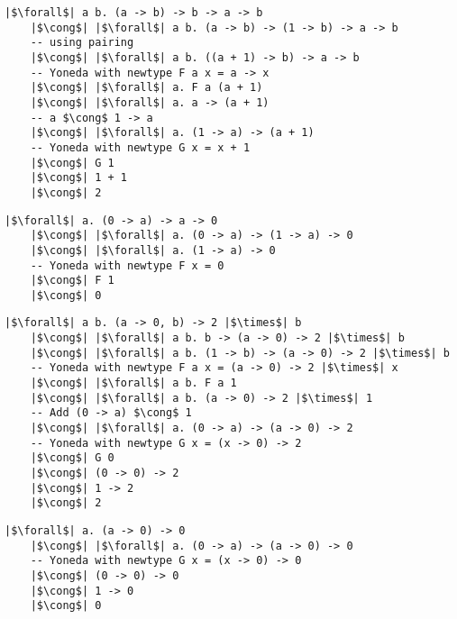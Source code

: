 \documentclass[tikz]{beamer}
\theoremstyle{definition}
\begin{document}
\begin{frame}[fragile]
\begin{verbatim}
|$\forall$| a b. (a -> b) -> b -> a -> b
    |$\cong$| |$\forall$| a b. (a -> b) -> (1 -> b) -> a -> b
    -- using pairing
    |$\cong$| |$\forall$| a b. ((a + 1) -> b) -> a -> b
    -- Yoneda with newtype F a x = a -> x
    |$\cong$| |$\forall$| a. F a (a + 1)
    |$\cong$| |$\forall$| a. a -> (a + 1)
    -- a $\cong$ 1 -> a
    |$\cong$| |$\forall$| a. (1 -> a) -> (a + 1)
    -- Yoneda with newtype G x = x + 1
    |$\cong$| G 1
    |$\cong$| 1 + 1
    |$\cong$| 2
\end{verbatim}
\end{frame}

\begin{frame}[fragile]
\begin{verbatim}
|$\forall$| a. (0 -> a) -> a -> 0
    |$\cong$| |$\forall$| a. (0 -> a) -> (1 -> a) -> 0
    |$\cong$| |$\forall$| a. (1 -> a) -> 0
    -- Yoneda with newtype F x = 0
    |$\cong$| F 1
    |$\cong$| 0
\end{verbatim}
\end{frame}

\begin{frame}[fragile]
\begin{verbatim}
|$\forall$| a b. (a -> 0, b) -> 2 |$\times$| b
    |$\cong$| |$\forall$| a b. b -> (a -> 0) -> 2 |$\times$| b
    |$\cong$| |$\forall$| a b. (1 -> b) -> (a -> 0) -> 2 |$\times$| b
    -- Yoneda with newtype F a x = (a -> 0) -> 2 |$\times$| x
    |$\cong$| |$\forall$| a b. F a 1
    |$\cong$| |$\forall$| a b. (a -> 0) -> 2 |$\times$| 1
    -- Add (0 -> a) $\cong$ 1
    |$\cong$| |$\forall$| a. (0 -> a) -> (a -> 0) -> 2
    -- Yoneda with newtype G x = (x -> 0) -> 2
    |$\cong$| G 0
    |$\cong$| (0 -> 0) -> 2
    |$\cong$| 1 -> 2
    |$\cong$| 2
\end{verbatim}
\end{frame}

\begin{frame}[fragile]
\begin{verbatim}
|$\forall$| a. (a -> 0) -> 0
    |$\cong$| |$\forall$| a. (0 -> a) -> (a -> 0) -> 0
    -- Yoneda with newtype G x = (x -> 0) -> 0
    |$\cong$| (0 -> 0) -> 0
    |$\cong$| 1 -> 0
    |$\cong$| 0
\end{verbatim}
\end{frame}
\end{document}
